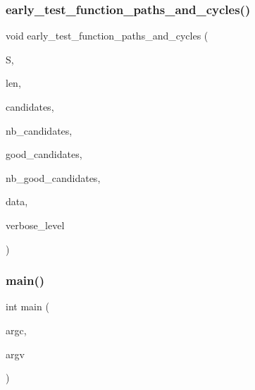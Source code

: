 \subsubsection{\texorpdfstring{early\+\_\+test\+\_\+function\+\_\+paths\+\_\+and\+\_\+cycles()}{early\_test\_function\_paths\_and\_cycles()}}
{\footnotesize\ttfamily void early\+\_\+test\+\_\+function\+\_\+paths\+\_\+and\+\_\+cycles (\begin{DoxyParamCaption}\item[{\mbox{\hyperlink{galois_8h_a09fddde158a3a20bd2dcadb609de11dc}{I\+NT}} $\ast$}]{S,  }\item[{\mbox{\hyperlink{galois_8h_a09fddde158a3a20bd2dcadb609de11dc}{I\+NT}}}]{len,  }\item[{\mbox{\hyperlink{galois_8h_a09fddde158a3a20bd2dcadb609de11dc}{I\+NT}} $\ast$}]{candidates,  }\item[{\mbox{\hyperlink{galois_8h_a09fddde158a3a20bd2dcadb609de11dc}{I\+NT}}}]{nb\+\_\+candidates,  }\item[{\mbox{\hyperlink{galois_8h_a09fddde158a3a20bd2dcadb609de11dc}{I\+NT}} $\ast$}]{good\+\_\+candidates,  }\item[{\mbox{\hyperlink{galois_8h_a09fddde158a3a20bd2dcadb609de11dc}{I\+NT}} \&}]{nb\+\_\+good\+\_\+candidates,  }\item[{void $\ast$}]{data,  }\item[{\mbox{\hyperlink{galois_8h_a09fddde158a3a20bd2dcadb609de11dc}{I\+NT}}}]{verbose\+\_\+level }\end{DoxyParamCaption})}

\mbox{\label{all__cycles_8_c_a3c04138a5bfe5d72780bb7e82a18e627}} 
\subsubsection{\texorpdfstring{main()}{main()}}
{\footnotesize\ttfamily int main (\begin{DoxyParamCaption}\item[{int}]{argc,  }\item[{char $\ast$$\ast$}]{argv }\end{DoxyParamCaption})}

\mbox{\label{all__cycles_8_c_a0f75338604b3e69ac0915f7fcd122ec7}} 
